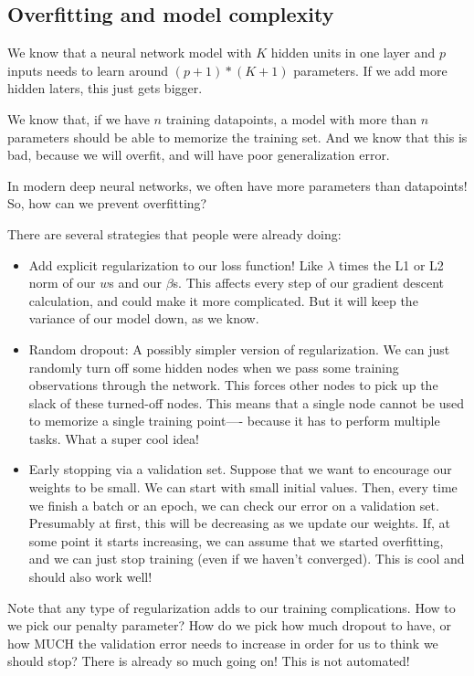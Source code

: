 \subsection{Overfitting and model complexity}

We know that a neural network model with $K$ hidden units in one layer and $p$ inputs needs to learn around $(p+1)*(K+1)$ parameters. If we add more hidden laters, this just gets bigger.

We know that, if we have $n$ training datapoints, a model with more than $n$ parameters should be able to memorize the training set. And we know that this is bad, because we will overfit, and will have poor generalization error. 

In modern deep neural networks, we often have more parameters than datapoints! So, how can we prevent overfitting?

There are several strategies that people were already doing:
\begin{itemize}
\item Add explicit regularization to our loss function! Like $\lambda$ times the L1 or L2 norm of our $w$s and our $\beta$s. This affects every step of our gradient descent calculation, and could make it more complicated. But it will keep the variance of our model down, as we know. 
\item Random dropout: A possibly simpler version of regularization. We can just randomly turn off some hidden nodes when we pass some training observations through the network. This forces other nodes to pick up the slack of these turned-off nodes. This means that a single node cannot be used to memorize a single training point---- because it has to perform multiple tasks. What a super cool idea!  
\item Early stopping via a validation set. Suppose that we want to encourage our weights to be small. We can start with small initial values. Then, every time we finish a batch or an epoch, we can check our error on a validation set. Presumably at first, this will be decreasing as we update our weights. If, at some point it starts increasing, we can assume that we started overfitting, and we can just stop training (even if we haven't converged). This is cool and should also work well! 
\end{itemize}
Note that any type of regularization adds to our training complications. How to we pick our penalty parameter? How do we pick how much dropout to have, or how MUCH the validation error needs to increase in order for us to think we should stop? There is already so much going on! This is not automated! 

